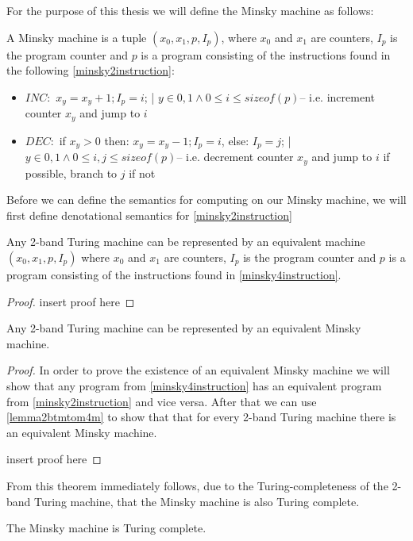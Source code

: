For the purpose of this thesis we will define the Minsky machine as follows:
\begin{definition}
A Minsky machine is a tuple $(x_0, x_1, p, I_p)$, where $x_0$ and $x_1$ are counters, $I_p$ is the program counter and $p$ is a program consisting of the instructions found in the following \autoref{minsky2instruction}:
\begin{instructionset}
\label{minsky2instruction}
\hfill
\begin{itemize}
\item{$INC:$} $x_y = x_y + 1; I_p = i$; | $ y\in{0,1} \land 0 \leq i \leq sizeof(p)$\hfill\break -- i.e. increment counter $x_y$ and jump to $i$
\item{$DEC:$} if $x_y > 0$ then: $x_y = x_y - 1; I_p = i$, else: $I_p = j$; | $ y\in{0,1} \land 0 \leq i,j \leq sizeof(p)$\hfill\break -- i.e. decrement counter $x_y$ and jump to $i$ if possible, branch to $j$ if not
\end{itemize}
\end{instructionset}
\end{definition}
Before we can define the semantics for computing on our Minsky machine, we will first define denotational semantics for \autoref{minsky2instruction}
\begin{definition}

\end{definition}
\begin{lemma}
\label{lemma2btmtom4m}
Any 2-band Turing machine can be represented by an equivalent machine $(x_0, x_1, p, I_p)$ where $x_0$ and $x_1$ are counters, $I_p$ is the program counter and $p$ is a program consisting of the instructions found in \autoref{minsky4instruction}.
\begin{proof}
insert proof here
\end{proof}
\end{lemma}
\begin{theorem}
Any 2-band Turing machine can be represented by an equivalent Minsky machine.
\begin{proof}
In order to prove the existence of an equivalent Minsky machine we will show that any program from \autoref{minsky4instruction} has an equivalent program from \autoref{minsky2instruction} and vice versa. After that we can use \autoref{lemma2btmtom4m} to show that that for every 2-band Turing machine there is an equivalent Minsky machine.

insert proof here
\end{proof}
\end{theorem}
From this theorem immediately follows, due to the Turing-completeness of the 2-band Turing machine, that the Minsky machine is also Turing complete.
\begin{corollary}
The Minsky machine is Turing complete.
\end{corollary}

